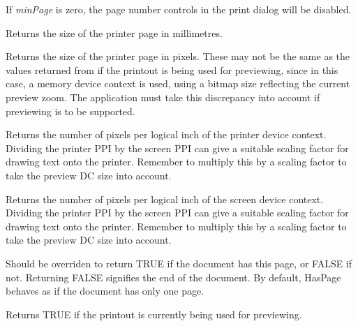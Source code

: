 If {\it minPage} is zero, the page number controls in the print dialog will be disabled.



Returns the size of the printer page in millimetres.



Returns the size of the printer page in pixels. These may not be the
same as the values returned from  if
the printout is being used for previewing, since in this case, a
memory device context is used, using a bitmap size reflecting the current
preview zoom. The application must take this discrepancy into account if
previewing is to be supported.



Returns the number of pixels per logical inch of the printer device context.
Dividing the printer PPI by the screen PPI can give a suitable scaling
factor for drawing text onto the printer. Remember to multiply
this by a scaling factor to take the preview DC size into account.



Returns the number of pixels per logical inch of the screen device context.
Dividing the printer PPI by the screen PPI can give a suitable scaling
factor for drawing text onto the printer. Remember to multiply
this by a scaling factor to take the preview DC size into account.



Should be overriden to return TRUE if the document has this page, or FALSE
if not. Returning FALSE signifies the end of the document. By default,
HasPage behaves as if the document has only one page.



Returns TRUE if the printout is currently being used for previewing.

